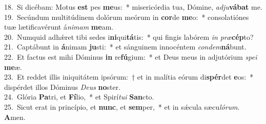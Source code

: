 {18.~}Si dicébam: Motus \textbf{est} pes \textbf{me}us:~* misericórdia tua, Dómine, \textit{ad}\textit{ju}\textbf{vá}\textbf{bat} me.\\
{19.~}Secúndum multitúdinem dolórum meórum in \textbf{cor}de \textbf{me}o:~* consolatiónes tuæ lætificavérunt á\textit{ni}\textit{mam} \textbf{me}am.\\
{20.~}Numquid adhǽret tibi sedes i\textbf{ni}qui\textbf{tá}tis:~* qui fingis labórem \textit{in} \textit{præ}\textbf{cép}to?\\
{21.~}Captábunt in \textbf{á}nimam \textbf{ju}sti:~* et sánguinem innocéntem \textit{con}\textit{dem}\textbf{ná}bunt.\\
{22.~}Et factus est mihi Dóminus \textbf{in} re\textbf{fú}gium:~* et Deus meus in adjutórium \textit{spe}\textit{i} \textbf{me}æ.\\
{23.~}Et reddet illis iniquitátem ipsórum:~† et in malítia eórum di\textbf{spér}det \textbf{e}os:~* dispérdet illos Dóminus \textit{De}\textit{us} \textbf{no}ster.\\
{24.~}Glória \textbf{Pa}tri, et \textbf{Fí}lio,~* et Spirí\textit{tu}\textit{i} \textbf{San}cto.\\
{25.~}Sicut erat in princípio, et \textbf{nunc}, et \textbf{sem}per,~* et in sǽcula sæcu\textit{ló}\textit{rum}. \textbf{A}men.\\
